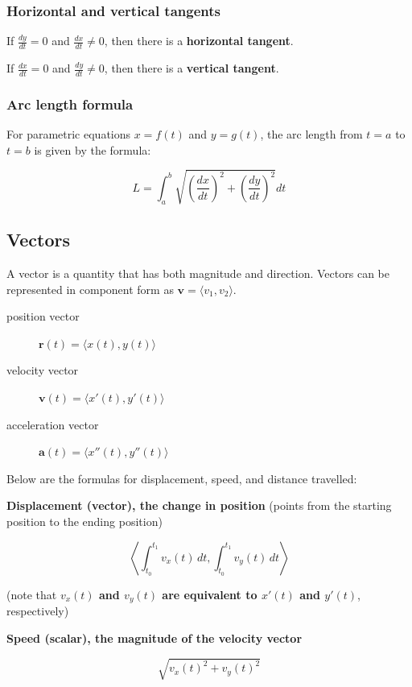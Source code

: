 \documentclass[letterpaper, 12pt]{article}
\begin{document}
\subsubsection*{Horizontal and vertical tangents}

If $\frac{dy}{dt} = 0$ and $\frac{dx}{dt} \neq 0$, then there is a \textbf{horizontal tangent}.

If $\frac{dx}{dt} = 0$ and $\frac{dy}{dt} \neq 0$, then there is a \textbf{vertical tangent}.

\subsubsection*{Arc length formula}

For parametric equations $x = f(t)$ and $y = g(t)$, the arc length from $t = a$ to $t = b$ is given by the formula:

$$L = \int_a^b \sqrt{\left(\frac{dx}{dt}\right)^2 + \left(\frac{dy}{dt}\right)^2} dt$$

\subsection*{Vectors}

A vector is a quantity that has both magnitude and direction. Vectors can be represented in component form as $\mathbf{v} = \langle v_1, v_2 \rangle$.

\begin{description}
\item[position vector] $\mathbf{r}(t) = \langle x(t), y(t) \rangle$
\item [velocity vector] $\mathbf{v}(t) = \langle x'(t), y'(t) \rangle$
\item [acceleration vector] $\mathbf{a}(t) = \langle x''(t), y''(t) \rangle$
\end{description}

Below are the formulas for displacement, speed, and distance travelled:

\textbf{Displacement (vector), the change in position} (points from the starting position to the ending position)

$$\left \langle \int_{t_0}^{t_1} v_x(t) \, dt, \int_{t_0}^{t_1} v_y(t) \, dt \right \rangle$$

(note that \textbf{$v_x(t)$ and $v_y(t)$ are equivalent to $x'(t)$ and $y'(t)$}, respectively)

\textbf{Speed (scalar), the magnitude of the velocity vector}

$$\sqrt{v_x(t)^2 + v_y(t)^2}$$
\end{document}
